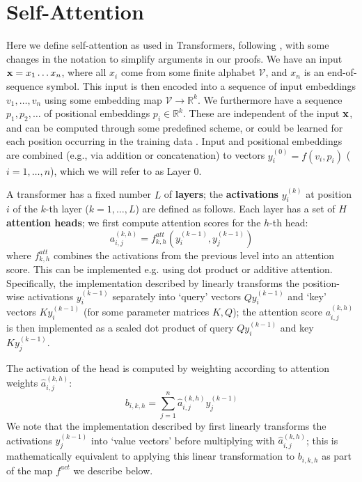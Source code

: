 \documentclass[11pt,a4paper]{article}
\newcommand{\key}[1]{\textbf{#1}}
\begin{document}
\section{Self-Attention}\label{sec:def-selfatt}
Here we define self-attention as used in Transformers, following \citet{vaswani2017attention}, with some changes in the notation to simplify arguments in our proofs.
We have an input ${\bf x} = x_1 \dots x_n$, where all $x_i$ come from some finite alphabet $\mathcal{V}$, and $x_n$ is an end-of-sequence symbol.
This input is then encoded into a sequence of input embeddings $v_1,\dots,v_n$ using some embedding map $\mathcal{V} \rightarrow \mathbb{R}^k$. 
We furthermore have a sequence $p_1, p_2, \dots$ of positional embeddings $p_i \in \mathbb{R}^k$. These are independent of the input ${\bf x}$, and can be computed through some predefined scheme, or could be learned for each position occurring in the training data \citep{vaswani2017attention}.
Input and positional embeddings are combined (e.g., via addition or concatenation) to vectors $y_i^{(0)} = f(v_i, p_i)$ ($i=1, \dots, n$), which we will refer to as Layer 0.

A transformer has a fixed number $L$ of \key{layers}; the \key{activations} $y_i^{(k)}$ at position $i$ of the $k$-th layer ($k=1, \dots, L$) are defined as follows.
Each layer has a set of $H$ \key{attention heads}; we first compute attention scores for the $h$-th head:
\begin{equation}
    a_{i,j}^{(k,h)} = f^{att}_{k,h}\left(y_i^{(k-1)}, y_j^{(k-1)}\right)
\end{equation}
where $f^{att}_{k,h}$ combines the activations from the previous level into an attention score.
This can be implemented e.g. using dot product or additive attention.
Specifically, the implementation described by \citet[p. 5]{vaswani2017attention} linearly transforms the position-wise activations $y_i^{(k-1)}$ separately into `query' vectors $Q y_i^{(k-1)}$ and `key' vectors $K y_i^{(k-1)}$ (for some parameter matrices $K, Q$); 
the attention score $a_{i,j}^{(k,h)}$ is then implemented as a scaled dot product of query $Q y_i^{(k-1)}$ and key $K y_j^{(k-1)}$.


The  activation of the head is computed by weighting according to attention weights $\hat{a}_{i,j}^{(k,h)}$:
\begin{equation}
    b_{i,k,h} = \sum_{j=1}^n \hat{a}_{i,j}^{(k,h)} y_j^{(k-1)} 
\end{equation}
We note that the implementation described by \citet{vaswani2017attention} first linearly transforms the activations $y_j^{(k-1)}$ into `value vectors' before multiplying with $ \hat{a}_{i,j}^{(k,h)}$; this is mathematically equivalent to applying this linear transformation to $b_{i,k,h}$ as part of the map $f^{act}$ we describe below.
\end{document}
